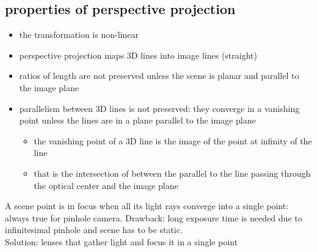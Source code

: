 \documentclass{article}
\begin{document}
\subsection{properties of perspective projection}
\begin{itemize}
	\item the transformation is non-linear
	\item perspective projection maps 3D lines into image lines (straight)
	\item ratios of length are not preserved unless the scene is planar and parallel to the image plane
	\item parallelism between 3D lines is not preserved: they converge in a vanishing point unless the lines are in a plane parallel to the image plane \begin{itemize}
		\item the vanishing point of a 3D line is the image of the point at infinity of the line
		\item that is the intersection of between the parallel to the line passing through the optical center and the image plane
	\end{itemize}
	
\end{itemize}

A scene point is in focus when all its light rays converge into a single point: always true for pinhole camera. Drawback: long exposure time is needed due to infinitesimal pinhole and scene has to be static.\\
Solution: lenses that gather light and focus it in a single point
\end{document}
